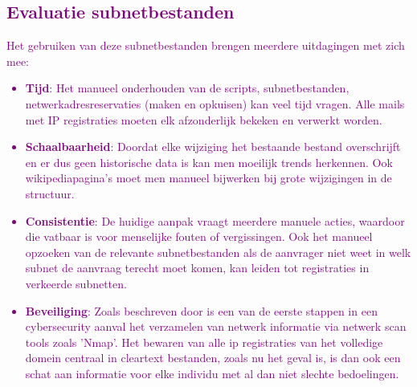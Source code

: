 \textcolor{purple}{
\subsection{Evaluatie subnetbestanden}
Het gebruiken van deze subnetbestanden brengen meerdere uitdagingen met zich mee:
\begin{itemize}
    \item \textbf{Tijd}: Het manueel onderhouden van de scripts, subnetbestanden, netwerkadresreservaties (maken en opkuisen) kan veel tijd vragen. Alle mails met IP registraties moeten elk afzonderlijk bekeken en verwerkt worden.
    \item \textbf{Schaalbaarheid}: Doordat elke wijziging het bestaande bestand overschrijft en er dus geen historische data is kan men moeilijk trends herkennen. Ook wikipediapagina's moet men manueel bijwerken bij grote wijzigingen in de structuur.
    \item \textbf{Consistentie}: De huidige aanpak vraagt meerdere manuele acties, waardoor die vatbaar is voor menselijke fouten of vergissingen. Ook het manueel opzoeken van de relevante subnetbestanden als de aanvrager niet weet in welk subnet de aanvraag terecht moet komen, kan leiden tot registraties in verkeerde subnetten.  
    \item \textbf{Beveiliging}: Zoals beschreven door \textcite{Liao2020} is een van de eerste stappen in een cybersecurity aanval het verzamelen van netwerk informatie via netwerk scan tools zoals 'Nmap'. Het bewaren van alle \acrshort{ip} registraties van het volledige domein centraal in cleartext bestanden, zoals nu het geval is, is dan ook een schat aan informatie voor elke individu met al dan niet slechte bedoelingen.
\end{itemize}
}
